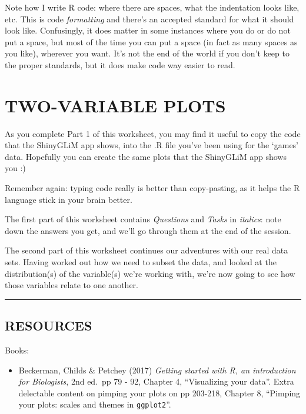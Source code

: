 \documentclass[
]{book}
\providecommand{\tightlist}{%
  \setlength{\itemsep}{0pt}\setlength{\parskip}{0pt}}
\begin{document}
Note how I write R code: where there are spaces, what the indentation looks like,
etc. This is code \emph{formatting} and there's an accepted standard for what it
should look like. Confusingly, it does matter in some instances where you do or
do not put a space, but most of the time you can put a space (in fact as many spaces
as you like), wherever you want. It's not the end of the world if you don't keep
to the proper standards, but it does make code way easier to read.

\hypertarget{two-variable-plots}{%
\chapter{TWO-VARIABLE PLOTS}\label{two-variable-plots}}

As you complete Part 1 of this worksheet, you may find it useful to copy the code that the ShinyGLiM
app shows, into the .R file you've been using for the `games' data. Hopefully
you can create the same plots that the ShinyGLiM app shows you :)

Remember again: typing code really is better than copy-pasting, as it helps the R language stick in your
brain better.

The first part of this worksheet contains \emph{Questions} and \emph{Tasks} in \emph{italics}: note
down the answers you get, and we'll go through them at the end of the session.

The second part of this worksheet continues our adventures with our real data sets.
Having worked out how we need to subset the data, and looked at the distribution(s)
of the variable(s) we're working with, we're now going to see how those variables
relate to one another.\\

\begin{center}\rule{0.5\linewidth}{0.5pt}\end{center}

\hypertarget{resources}{%
\section{RESOURCES}\label{resources}}

Books:

\begin{itemize}
\tightlist
\item
  Beckerman, Childs \& Petchey (2017) \emph{Getting started with R, an
  introduction for Biologists}, 2nd ed.~pp 79 - 92, Chapter 4, ``Visualizing
  your data''. Extra delectable content on pimping your plots on pp 203-218,
  Chapter 8, ``Pimping your plots: scales and themes in \texttt{ggplot2}''.
  ~
\end{itemize}
\end{document}
